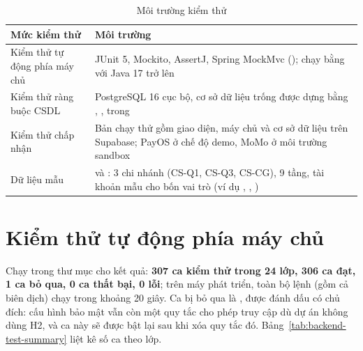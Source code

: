 \begin{table}[!htbp]
\centering
\caption{Môi trường kiểm thử}
\label{tab:test-environment}
\small
\renewcommand{\arraystretch}{1.2}
\begin{tabularx}{\linewidth}{|P{4.0cm}|L|}
\hline
\textbf{Mức kiểm thử} & \textbf{Môi trường} \\
\hline
Kiểm thử tự động phía máy chủ & JUnit 5, Mockito, AssertJ, Spring MockMvc (); chạy bằng  với Java 17 trở lên \\
\hline
Kiểm thử ràng buộc CSDL & PostgreSQL 16 cục bộ, cơ sở dữ liệu trống được dựng bằng , ,  trong  \\
\hline
Kiểm thử chấp nhận & Bản chạy thử gồm giao diện, máy chủ và cơ sở dữ liệu trên Supabase; PayOS ở chế độ demo, MoMo ở môi trường sandbox \\
\hline
Dữ liệu mẫu &  và : 3 chi nhánh (CS-Q1, CS-Q3, CS-CG), 9 tầng, tài khoản mẫu cho bốn vai trò (ví dụ , , ) \\
\hline
\end{tabularx}
\end{table}

\section{Kiểm thử tự động phía máy chủ}
\label{sec:kt-backend}

Chạy  trong thư mục  cho kết quả: \textbf{307 ca kiểm thử trong 24 lớp, 306 ca đạt, 1 ca bỏ qua, 0 ca thất bại, 0 lỗi}; trên máy phát triển, toàn bộ lệnh (gồm cả biên dịch) chạy trong khoảng 20 giây. Ca bị bỏ qua là , được đánh dấu  có chủ đích: cấu hình bảo mật vẫn còn một quy tắc cho phép truy cập  dù dự án không dùng H2, và ca này sẽ được bật lại sau khi xóa quy tắc đó. Bảng~\ref{tab:backend-test-summary} liệt kê số ca theo lớp.

